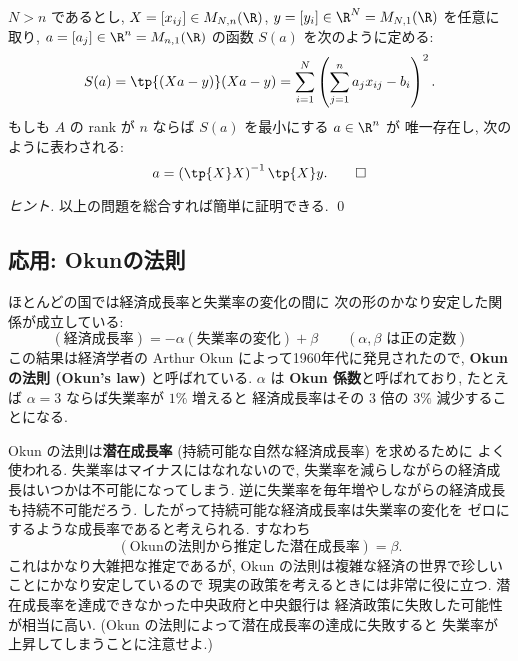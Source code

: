 \documentclass[12pt,twoside]{jarticle}
\begin{document}
\begin{question}[最小二乗法, 5点]
  $N>n$ であるとし, $X=[x_{ij}]\in M_{N,n}(\R)$, 
  $y=[y_i]\in\R^N=M_{N,1}(\R)$ を任意に取り, 
  $a=[a_j]\in\R^n=M_{n,1}(\R)$ の函数 $S(a)$ を次のように定める:
  \begin{equation*}
    S(a) = \tp{(Xa-y)}(Xa-y)
    = \sum_{i=1}^N
    \left(
      \sum_{j=1}^n a_j x_{ij} - b_i
    \right)^2.
  \end{equation*}
  もしも $A$ の rank が $n$ ならば $S(a)$ を最小にする $a\in\R^n$ が
  唯一存在し, 次のように表わされる:
  \begin{equation*}
    a = \left( \tp{X}X \right)^{-1} \tp{X}y.
    \qed
  \end{equation*}
\end{question}

\begin{proof}[ヒント]
  以上の問題を総合すれば簡単に証明できる. \qed
\end{proof}


\subsection{応用: Okunの法則}

ほとんどの国では経済成長率と失業率の変化の間に
次の形のかなり安定した関係が成立している:
\begin{equation*}
  (\text{経済成長率}) = - \alpha (\text{失業率の変化}) + \beta
  \qquad (\text{$\alpha, \beta$ は正の定数})
\end{equation*}
この結果は経済学者の Arthur Okun によって1960年代に発見されたので, 
{\bf Okun の法則 (Okun's law)} と呼ばれている.
$\alpha$ は {\bf Okun 係数}と呼ばれており, 
たとえば $\alpha=3$ ならば失業率が $1\%$ 増えると
経済成長率はその $3$ 倍の $3\%$ 減少することになる.

Okun の法則は{\bf 潜在成長率} (持続可能な自然な経済成長率) を求めるために
よく使われる. 
失業率はマイナスにはなれないので, 
失業率を減らしながらの経済成長はいつかは不可能になってしまう. 
逆に失業率を毎年増やしながらの経済成長も持続不可能だろう. 
したがって持続可能な経済成長率は失業率の変化を
ゼロにするような成長率であると考えられる. すなわち
\begin{equation*}
  (\text{Okunの法則から推定した潜在成長率}) = \beta.
\end{equation*}
これはかなり大雑把な推定であるが,
Okun の法則は複雑な経済の世界で珍しいことにかなり安定しているので
現実の政策を考えるときには非常に役に立つ.
潜在成長率を達成できなかった中央政府と中央銀行は
経済政策に失敗した可能性が相当に高い.
(Okun の法則によって潜在成長率の達成に失敗すると
失業率が上昇してしまうことに注意せよ.)
\end{document}
